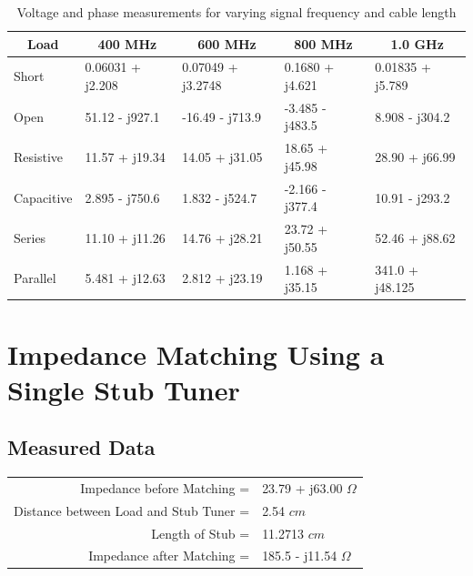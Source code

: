 \documentclass{article}
\begin{document}
\begin{table}[H]
\centering
\begin{tabular}{|l|l|l|l|l|}
\hline
\multicolumn{1}{|c|}{\textbf{Load}} & \multicolumn{1}{c|}{\textbf{400 MHz}} & \multicolumn{1}{c|}{\textbf{600 MHz}} & \multicolumn{1}{c|}{\textbf{800 MHz}} & \multicolumn{1}{c|}{\textbf{1.0 GHz}} \\ \hline
Short                               & 0.06031 + j2.208                      & 0.07049 + j3.2748                     & 0.1680 + j4.621                       & 0.01835 + j5.789                      \\ \hline
Open                                & 51.12 - j927.1                        & -16.49 - j713.9                       & -3.485 - j483.5                       & 8.908 - j304.2                        \\ \hline
Resistive                           & 11.57 + j19.34                        & 14.05 + j31.05                        & 18.65 + j45.98                        & 28.90 + j66.99                        \\ \hline
Capacitive                          & 2.895 - j750.6                        & 1.832 - j524.7                        & -2.166 - j377.4                       & 10.91 - j293.2                        \\ \hline
Series                              & 11.10 + j11.26                        & 14.76 + j28.21                        & 23.72 + j50.55                        & 52.46 + j88.62                        \\ \hline
Parallel                            & 5.481 + j12.63                        & 2.812 + j23.19                        & 1.168 + j35.15                        & 341.0 + j48.125
\\ \hline
\end{tabular}
	\caption{Voltage and phase measurements for varying signal frequency and cable length}
	\label{Data 1}
\end{table}

\section{Impedance Matching Using a Single Stub Tuner}

\subsection{Measured Data}

\begin{table}[H]
\centering
	\begin{tabular}{rl}
	Impedance before Matching =   			 & 23.79 + j63.00 $\Omega$  \\
	Distance between Load and Stub Tuner =   & 2.54 $cm$  \\
	Length of Stub =   						 & 11.2713 $cm$  \\
	Impedance after Matching =  			 & 185.5 - j11.54 $\Omega$
	\end{tabular}
\end{table}
\end{document}

